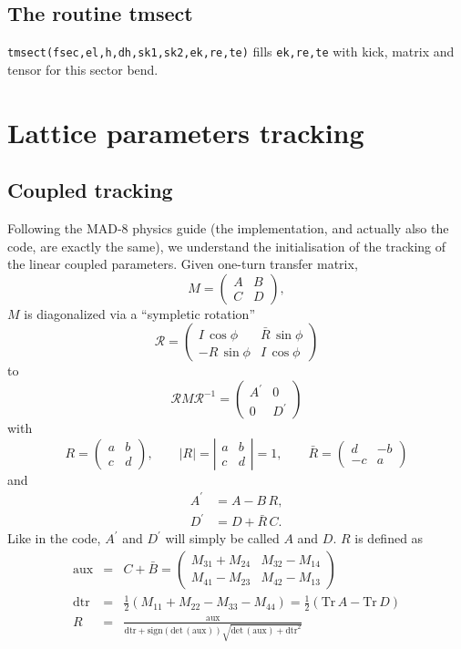 \documentclass{cern-art} %
\renewcommand{\L}[1]{\lstinline[firstnumber=last]{#1}}
\begin{document}
\subsection{The routine {tmsect}}
\L{tmsect(fsec,el,h,dh,sk1,sk2,ek,re,te)} fills \L{ek,re,te} with kick, matrix and tensor for this sector bend.

\section{Lattice parameters tracking}
\subsection{Coupled tracking}
Following the MAD-8 physics guide (the implementation, and actually also the code, are exactly the same), we understand the initialisation of the tracking of the linear coupled parameters. Given one-turn transfer matrix,
$$M=\left(\begin{array}{cc}
A & B\\
C & D
\end{array}\right),$$
$M$ is diagonalized via a ``sympletic rotation'' $$\mathcal{R}=\left(\begin{array}{cc}
I\,\cos\phi & \bar{R}\,\sin\phi\\
-R\,\sin\phi & I\,\cos\phi
\end{array}\right)$$
to
$$\mathcal{R}M\mathcal{R}^{-1}=\left(\begin{array}{cc}
A^{\prime} & 0\\
0 & D^{\prime}
\end{array}\right)$$
with
$$R=\left(\begin{array}{cc}
a & b\\
c & d
\end{array}\right),\qquad\left|R\right|=\left|\begin{array}{cc}
a & b\\
c & d
\end{array}\right|=1,\qquad\bar{R}=\left(\begin{array}{cc}
d & -b\\
-c & a
\end{array}\right)
$$
and
$$\begin{aligned}A^{\prime} & =A-B\, R,\\
D^{\prime} & =D+\bar{R}\, C.
\end{aligned}$$
Like in the code, $A^{\prime}$ and $D^{\prime}$ will simply be called $A$ and $D$. $R$ is defined as
\begin{eqnarray*}
\text{aux} & = & C+\bar{B}=\left(\begin{array}{cc}
M_{31}+M_{24} & M_{32}-M_{14}\\
M_{41}-M_{23} & M_{42}-M_{13}
\end{array}\right)\\
\text{dtr} & = & \frac{1}{2}\left(M_{11}+M_{22}-M_{33}-M_{44}\right)=\frac{1}{2}\left(\mathrm{Tr}\, A-\mathrm{Tr}\, D\right)\\
R & = & \frac{\text{aux}}{\text{dtr}+\mathrm{sign}\left(\mathrm{det}\,\left(\text{aux}\right)\right)\sqrt{\mathrm{det}\,\left(\text{aux}\right)+\text{dtr}^{2}}}
\end{eqnarray*}
\end{document}
